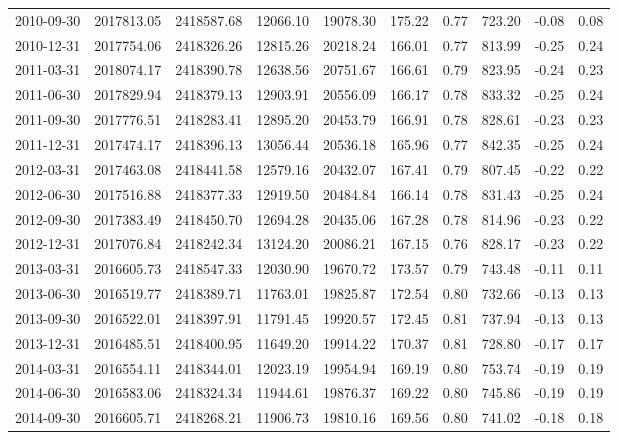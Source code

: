 \begin{landscape}
\begin{longtable}{llllllllll}
2010-09-30 & 2017813.05 & 2418587.68 & 12066.10 & 19078.30 & 175.22 & 0.77         & 723.20   & -0.08    & 0.08     \\
2010-12-31 & 2017754.06 & 2418326.26 & 12815.26 & 20218.24 & 166.01 & 0.77         & 813.99   & -0.25    & 0.24     \\
2011-03-31 & 2018074.17 & 2418390.78 & 12638.56 & 20751.67 & 166.61 & 0.79         & 823.95   & -0.24    & 0.23     \\
2011-06-30 & 2017829.94 & 2418379.13 & 12903.91 & 20556.09 & 166.17 & 0.78         & 833.32   & -0.25    & 0.24     \\
2011-09-30 & 2017776.51 & 2418283.41 & 12895.20 & 20453.79 & 166.91 & 0.78         & 828.61   & -0.23    & 0.23     \\
2011-12-31 & 2017474.17 & 2418396.13 & 13056.44 & 20536.18 & 165.96 & 0.77         & 842.35   & -0.25    & 0.24     \\
2012-03-31 & 2017463.08 & 2418441.58 & 12579.16 & 20432.07 & 167.41 & 0.79         & 807.45   & -0.22    & 0.22     \\
2012-06-30 & 2017516.88 & 2418377.33 & 12919.50 & 20484.84 & 166.14 & 0.78         & 831.43   & -0.25    & 0.24     \\
2012-09-30 & 2017383.49 & 2418450.70 & 12694.28 & 20435.06 & 167.28 & 0.78         & 814.96   & -0.23    & 0.22     \\
2012-12-31 & 2017076.84 & 2418242.34 & 13124.20 & 20086.21 & 167.15 & 0.76         & 828.17   & -0.23    & 0.22     \\
2013-03-31 & 2016605.73 & 2418547.33 & 12030.90 & 19670.72 & 173.57 & 0.79         & 743.48   & -0.11    & 0.11     \\
2013-06-30 & 2016519.77 & 2418389.71 & 11763.01 & 19825.87 & 172.54 & 0.80         & 732.66   & -0.13    & 0.13     \\
2013-09-30 & 2016522.01 & 2418397.91 & 11791.45 & 19920.57 & 172.45 & 0.81         & 737.94   & -0.13    & 0.13     \\
2013-12-31 & 2016485.51 & 2418400.95 & 11649.20 & 19914.22 & 170.37 & 0.81         & 728.80   & -0.17    & 0.17     \\
2014-03-31 & 2016554.11 & 2418344.01 & 12023.19 & 19954.94 & 169.19 & 0.80         & 753.74   & -0.19    & 0.19     \\
2014-06-30 & 2016583.06 & 2418324.34 & 11944.61 & 19876.37 & 169.22 & 0.80         & 745.86   & -0.19    & 0.19     \\
2014-09-30 & 2016605.71 & 2418268.21 & 11906.73 & 19810.16 & 169.56 & 0.80         & 741.02   & -0.18    & 0.18     \\

\end{longtable}
\end{landscape}
